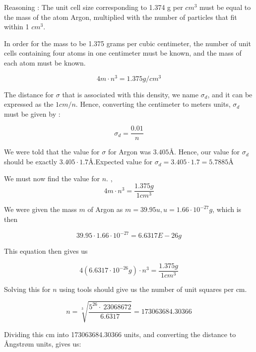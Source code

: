Reasoning : The unit cell size corresponding to 1.374 g per $cm^3$ must be equal to the mass of the atom Argon, multiplied with the number of particles that fit within 1 $cm^3$.

In order for the mass to be 1.375 grams per cubic centimeter, the number of unit cells containing four atoms in one centimeter must be known, and the mass of each atom must be known. 


\begin{equation}
4m \cdot  n^3 = 1.375 g/cm^3
\end{equation}

The distance for  $\sigma $ that is associated with this density, we name $\sigma_d$, and it can be expressed as the $1 cm / n$. Hence, converting the centimeter to meters units, $\sigma_d$ must be given by :


\begin{equation}
\sigma_d= \frac{0.01}{n}
\end{equation}

We were told that the value for $\sigma$ for Argon was $3.405Å$. Hence, our value for $\sigma_d$ should be exactly $3.405 \cdot 1.7 Å$.Expected value for $\sigma_d = 3.405 \cdot 1.7 = 5.7885 Å$

We must now find the value for $n$. , 
\begin{equation}
4m \cdot  n^3 = \frac{1.375 g}{1 cm^3} 
\end{equation}


We were given the mass $m$ of Argon as $m = 39.95 u, u = 1.66 \cdot 10^{-27}g$, which is then 

\begin{equation}
39.95 \cdot 1.66 \cdot 10^{-27} = 6.6317E-26 g 
\end{equation}

This equation then gives us

\begin{equation}
4(6.6317 \cdot 10^{-26} g ) \cdot  n^3 = \frac{1.375 g}{1 cm^3}
\end{equation}

Solving this for $n$ using tools should give us the number of unit squares per cm.

\begin{equation}
n =\sqrt[3]{\frac{5^{26}\cdot \:23068672}{6.6317}} = 173063684.30366
\end{equation}

Dividing this cm into 173063684.30366 units, and converting the distance to Ångstrøm units,  gives us:

